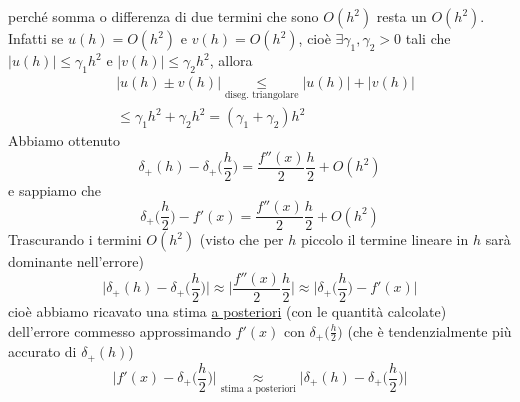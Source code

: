 perché somma o differenza di due termini che sono
$O(h^2)$ resta un $O(h^2)$.\\
Infatti se $u(h)=O(h^2)$ e $v(h)=O(h^2)$, cioè $\exists \gamma_1, \gamma_2 > 0$ tali che $|u(h)|\leq \gamma_1 h^2$ e $|v(h)|\leq \gamma_2 h^2$, allora
\begin{equation*}
    \begin{split}
        & |u(h) \pm v(h)| \underset{\text{diseg. triangolare}}{\leq} |u(h)|+|v(h)| \\
        & \leq \gamma_1 h^2 + \gamma_2 h^2 = (\gamma_1 + \gamma_2) h^2
    \end{split}    
\end{equation*}
Abbiamo ottenuto
\begin{equation*}
    \delta_+(h) - \delta_+\biggl(\frac{h}{2}\biggr) = \frac{f''(x)}{2}\frac{h}{2} + O(h^2)
\end{equation*}
e sappiamo che 
\begin{equation*}
    \delta_+\biggl(\frac{h}{2}\biggr) - f'(x) = \frac{f''(x)}{2}\frac{h}{2} + O(h^2)
\end{equation*}
Trascurando i termini $O(h^2)$ (visto che per $h$ piccolo il termine lineare in $h$ sarà dominante nell'errore)
\begin{equation*}
    \biggl|\delta_+(h) - \delta_+\biggl(\frac{h}{2}\biggr)\biggr| \approx \biggl|\frac{f''(x)}{2}\frac{h}{2}\biggr| \approx \biggl|\delta_+\biggl(\frac{h}{2}\biggr) - f'(x) \biggr|
\end{equation*}
cioè abbiamo ricavato una stima \uline{a posteriori} (con le quantità calcolate) dell'errore commesso approssimando $f'(x)$ con $\delta_+\bigl(\frac{h}{2}\bigr)$ (che è tendenzialmente più accurato di $\delta_+(h)$)
\begin{equation*}
     \biggl|f'(x) - \delta_+\biggl(\frac{h}{2}\biggr) \biggr| \underset{\text{stima a posteriori}}{\approx} \biggl|\delta_+(h) - \delta_+\biggl(\frac{h}{2}\biggr)\biggr|
\end{equation*}

